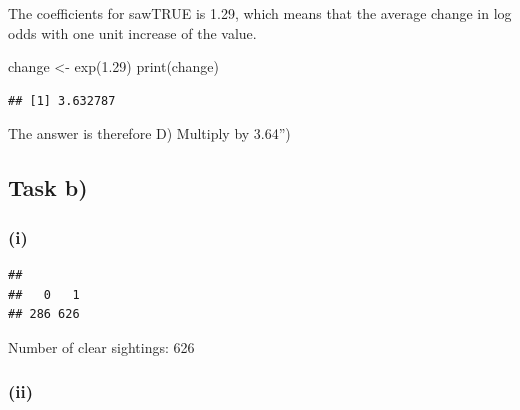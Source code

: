 \documentclass[
]{article}
\newenvironment{Shaded}{\begin{snugshade}}{\end{snugshade}}
\newcommand{\AttributeTok}[1]{\textcolor[rgb]{0.77,0.63,0.00}{#1}}
\newcommand{\FloatTok}[1]{\textcolor[rgb]{0.00,0.00,0.81}{#1}}
\newcommand{\FunctionTok}[1]{\textcolor[rgb]{0.00,0.00,0.00}{#1}}
\newcommand{\NormalTok}[1]{#1}
\newcommand{\OtherTok}[1]{\textcolor[rgb]{0.56,0.35,0.01}{#1}}
\newcommand{\SpecialCharTok}[1]{\textcolor[rgb]{0.00,0.00,0.00}{#1}}
\begin{document}
The coefficients for sawTRUE is 1.29, which means that the average
change in log odds with one unit increase of the value.

\begin{Shaded}
\begin{Highlighting}[]
\NormalTok{change }\OtherTok{\textless{}{-}} \FunctionTok{exp}\NormalTok{(}\FloatTok{1.29}\NormalTok{)}
\FunctionTok{print}\NormalTok{(change)}
\end{Highlighting}
\end{Shaded}

\begin{verbatim}
## [1] 3.632787
\end{verbatim}

The answer is therefore D) Multiply by 3.64'')

\hypertarget{task-b}{%
\subsection{Task b)}\label{task-b}}

\hypertarget{i-2}{%
\subsubsection{(i)}\label{i-2}}

\begin{Shaded}
\end{Shaded}

\begin{verbatim}
## 
##   0   1 
## 286 626
\end{verbatim}

Number of clear sightings: 626

\hypertarget{ii-3}{%
\subsubsection{(ii)}\label{ii-3}}
\end{document}
